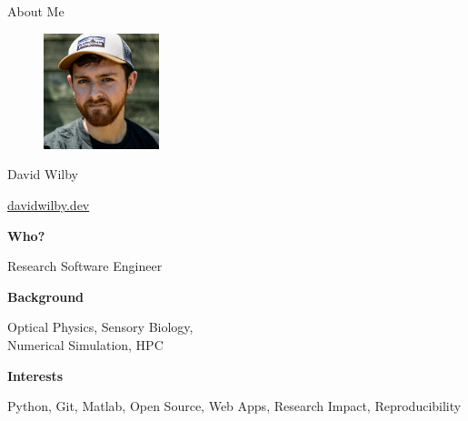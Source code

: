 \documentclass{beamer} %
\begin{document}
  \begin{frame}{About Me}

    \begin{figure}
        \includegraphics[width=0.3\textwidth]{wilby}
    \end{figure}

    David Wilby

    \href{https://davidwilby.dev/}{davidwilby.dev}

    \textbf{Who?}
    
    Research Software Engineer

    \textbf{Background}

    Optical Physics, Sensory Biology, \\Numerical Simulation, HPC

    \textbf{Interests}

    Python, Git, Matlab, Open Source, Web Apps, Research Impact, Reproducibility

  \end{frame}
\end{document}
